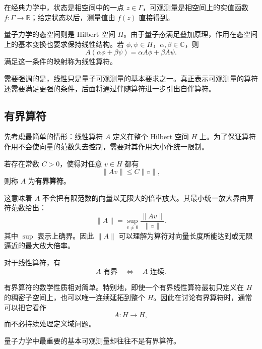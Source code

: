 \documentclass[UTF8,a4paper,11pt,openany]{ctexbook}
\begin{document}
在经典力学中，状态是相空间中的一点 $z\in\Gamma$，可观测量是相空间上的实值函数 $f:\Gamma\to\mathbb R$；给定状态以后，测量值由 $f(z)$ 直接得到。

量子力学的态空间则是 Hilbert 空间 $H$。由于量子态满足叠加原理，作用在态空间上的基本变换也要求保持线性结构。若 $\phi,\psi\in H$，$\alpha,\beta\in\mathbb C$，则
\begin{equation}
    A(\alpha\phi+\beta\psi)
    =
    \alpha A\phi+\beta A\psi.
\end{equation}
满足这一条件的映射称为线性算符。

需要强调的是，线性只是量子可观测量的基本要求之一。真正表示可观测量的算符还需要满足更强的条件，后面将通过伴随算符进一步引出自伴算符。

\subsection{有界算符}

先考虑最简单的情形：线性算符 $A$ 定义在整个 Hilbert 空间 $H$ 上。为了保证算符作用不会使向量的范数失去控制，需要对其作用大小作统一限制。

\begin{definition}[有界算符]
若存在常数 $C>0$，使得对任意 $v\in H$ 都有
\begin{equation}
    \|Av\|\leq C\|v\|,
\end{equation}
则称 $A$ 为\textbf{有界算符}。
\end{definition}

这意味着 $A$ 不会把有限范数的向量以无限大的倍率放大。其最小统一放大界由算符范数给出：
\begin{equation}
    \|A\|
    =
    \sup_{v\neq0}
    \frac{\|Av\|}{\|v\|}.
\end{equation}
其中 $\sup$ 表示上确界。因此 $\|A\|$ 可以理解为算符对向量长度所能达到或无限逼近的最大放大倍率。

对于线性算符，有
\begin{equation}
    A\text{ 有界}
    \quad\Longleftrightarrow\quad
    A\text{ 连续}.
\end{equation}

有界算符的数学性质相对简单。特别地，即使一个有界线性算符最初只定义在 $H$ 的稠密子空间上，也可以唯一连续延拓到整个 $H$。因此在讨论有界算符时，通常可以把它看作
\[
A:H\to H,
\]
而不必持续处理定义域问题。

量子力学中最重要的基本可观测量却往往不是有界算符。

\end{document}
